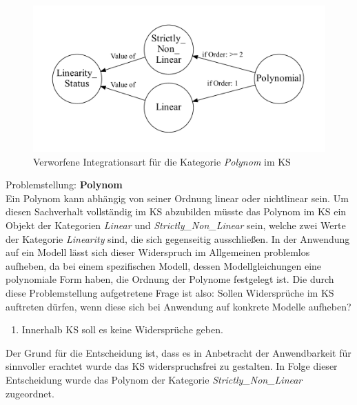 \begin{figure}[H]
	\centering
	\includegraphics[width=1\linewidth]{Ausschnitt_KS_Poly_Linearity}
	\caption[Kategorie \textit{Polynom} im KS - verworfene Integrationsart]{Verworfene Integrationsart für die Kategorie \textit{Polynom} im KS}
	\label{fig:KS_Poly_False}
\end{figure}
Problemstellung: \textbf{Polynom}\\
Ein Polynom kann abhängig von seiner Ordnung linear oder nichtlinear sein. Um diesen Sachverhalt vollständig im KS abzubilden müsste das Polynom im KS ein Objekt der Kategorien \textit{Linear} und \textit{Strictly\_Non\_Linear} sein, welche zwei Werte der Kategorie \textit{Linearity} sind, die sich gegenseitig ausschließen. In der Anwendung auf ein Modell lässt sich dieser Widerspruch im Allgemeinen problemlos aufheben, da bei einem spezifischen Modell, dessen Modellgleichungen eine polynomiale Form haben, die Ordnung der Polynome festgelegt ist. Die durch diese Problemstellung aufgetretene Frage ist also: Sollen Widersprüche im KS auftreten dürfen, wenn diese sich bei Anwendung auf konkrete Modelle aufheben?
\begin{enumerate}[resume*]
	\item \label{E.KS_Widersprüche}Innerhalb KS soll es keine Widersprüche geben.
\end{enumerate}
Der Grund für die Entscheidung ist, dass es in Anbetracht der Anwendbarkeit für sinnvoller erachtet wurde das KS widerspruchsfrei zu gestalten. In Folge dieser Entscheidung wurde das Polynom der Kategorie \textit{Strictly\_Non\_Linear} zugeordnet.












